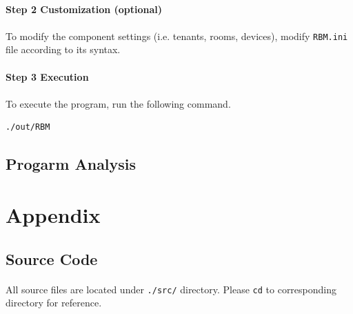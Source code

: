 \documentclass{article}
\begin{document}
            \paragraph{Step 2 Customization (optional)}
            \paragraph{}
                To modify the component settings (i.e. tenants, rooms, devices),
                modify \texttt{RBM.ini} file according to its syntax.
            \paragraph{Step 3 Execution}
            \paragraph{}
                To execute the program, run the following command.
            \begin{Verbatim}[gobble=8]
                ./out/RBM
            \end{Verbatim}

        \subsection{Progarm Analysis}
            
    \cleardoublepage
    \section{Appendix}
        \subsection{Source Code}
            \paragraph{}
                All source files are located under \texttt{./src/} directory. Please \texttt{cd}
                to corresponding directory for reference.
\end{document}
